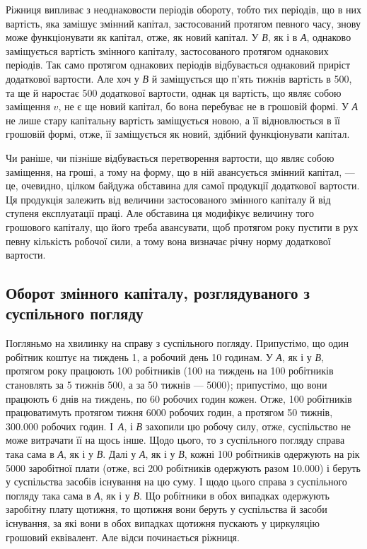 
Ріжниця випливає з неоднаковости періодів обороту, тобто тих періодів,
що в них вартість, яка замішує змінний капітал, застосований протягом
певного часу, знову може функціонувати як капітал, отже, як новий
капітал. У \emph{В}, як і в \emph{А}, однаково заміщується вартість змінного капіталу,
застосованого протягом однакових періодів. Так само протягом однакових
періодів відбувається однаковий приріст додаткової вартости. Але хоч у
\emph{В} й заміщується що п’ять тижнів вартість в 500, та ще й наростає
500 додаткової вартости, однак ця вартість, що являє собою
заміщення $v$, не є ще новий капітал, бо вона перебуває не в грошовій
формі. У \emph{А} не лише стару капітальну вартість заміщується новою, а її
відновлюється в її грошовій формі, отже, її заміщується як новий, здібний
функціонувати капітал.

Чи раніше, чи пізніше відбувається перетворення вартости, що являє
собою заміщення, на гроші, а тому на форму, що в ній авансується
змінний капітал, — це, очевидно, цілком байдужа обставина для самої
продукції додаткової вартости. Ця продукція залежить від величини застосованого
змінного капіталу й від ступеня експлуатації праці. Але обставина
ця модифікує величину того грошового капіталу, що його треба
авансувати, щоб протягом року пустити в рух певну кількість робочої
сили, а тому вона визначає річну норму додаткової вартости.

\subsection{Оборот змінного капіталу, розглядуваного з суспільного погляду}

Погляньмо на хвилинку на справу з суспільного погляду. Припустімо,
що один робітник коштує на тиждень 1, а робочий день \deq{} 10 годинам.
У \emph{А}, як і у \emph{В}, протягом року працюють 100 робітників (100 на тиждень на 100 робітників становлять за 5 тижнів 500, а
за 50 тижнів — 5000); припустімо, що вони працюють 6 днів на
тиждень, по 60 робочих годин кожен. Отже, 100 робітників працюватимуть
протягом тижня 6000 робочих годин, а протягом 50 тижнів, \num{300.000} робочих
годин. І~\emph{А}, і \emph{В} захопили цю робочу силу, отже, суспільство не може витрачати
її на щось інше. Щодо цього, то з суспільного погляду справа
така сама в \emph{А}, як і у \emph{В}. Далі у \emph{А}, як і у \emph{В}, кожні 100 робітників одержують
на рік 5000 заробітної плати (отже, всі 200 робітників
одержують разом \num{10.000}) і беруть у суспільства засобів існування
на цю суму. І щодо цього справа з суспільного погляду така сама в
\emph{А}, як і у \emph{В}. Що робітники в обох випадках одержують заробітну плату
щотижня, то щотижня вони беруть у суспільства й засоби існування, за
які вони в обох випадках щотижня пускають у циркуляцію грошовий
еквівалент. Але відси починається ріжниця.

